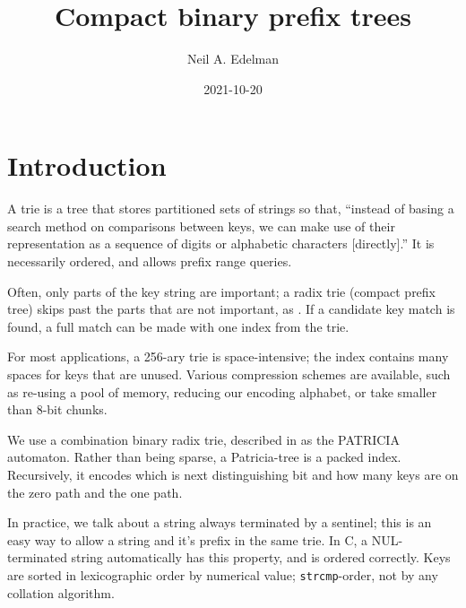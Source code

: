 \documentclass[12pt]{article}
\author{Neil A. Edelman}
\title{Compact binary prefix trees}
\date{2021-10-20}
\newcommand{\code}[1]{\colorbox{light-gray}{\texttt{#1}}}
\begin{document}
\maketitle


\section{Introduction}

A trie is a tree that stores partitioned sets of strings\cite{de1959file, fredkin1960trie, jacquet1991analysis, askitis2011redesigning} so that, ``instead of basing a search method on comparisons between keys, we can make use of their representation as a sequence of digits or alphabetic characters [directly].\cite{knuth1997sorting}'' It is necessarily ordered, and allows prefix range queries.

Often, only parts of the key string are important; a radix trie (compact prefix tree) skips past the parts that are not important, as \cite{askitis2007hat}. If a candidate key match is found, a full match can be made with one index from the trie.

For most applications, a 256-ary trie is space-intensive; the index contains many spaces for keys that are unused. Various compression schemes are available, such as re-using a pool of memory\cite{de1959file}, reducing our encoding alphabet, or take smaller than 8-bit chunks\cite{fredkin1960trie}.

We use a combination binary radix trie, described in \cite{morrison1968patricia} as the PATRICIA automaton. Rather than being sparse, a Patricia-tree is a packed index. Recursively, it encodes which is next distinguishing bit and how many keys are on the zero path and the one path.

In practice, we talk about a string always terminated by a sentinel; this is an easy way to allow a string and it's prefix in the same trie\cite{morrison1968patricia}. In C, a NUL-terminated string automatically has this property, and is ordered correctly. Keys are sorted in lexicographic order by numerical value; \code{strcmp}-order, not by any collation algorithm.
\end{document}
